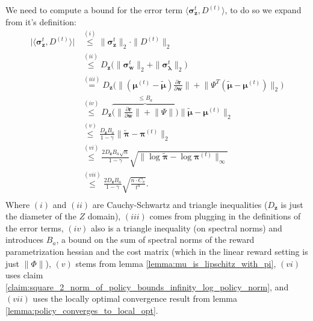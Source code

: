 We need to compute a bound for the error term $\langle \bm{\sigma}_{\bm{z}}^{t}, D^{(t)} \rangle$, to do so we expand from it's definition:
\begin{align*}
   \Big| \langle \bm{\sigma}_{\bm{z}}^{t}, D^{(t)} \rangle  \Big|
    &\stackrel{(i)}{\leq}  \|\bm{\sigma}_{\bm{z}}^{t} \|_2 \cdot \| D^{(t)}\|_2\\
    &\stackrel{(ii)}{\leq} D_{\bm{z}} \big(\|\bm{\sigma}_{\bm{w}}^{t} \|_2 + \|\bm{\sigma}_{\bm{\lambda}}^{t} \|_2 \big) \\
    &\stackrel{(iii)}{=} D_{\bm{z}} \Big(
        \Big\|
            (\bm{\mu}^{(t)} - \tilde{\bm{\mu}}) 
            \frac{\partial \bm{r}}{\partial \bm{w}}
        \Big\|
        + \Big\|
            \Psi^T (\tilde{\bm{\mu}}- \bm{\mu}^{(t)})
        \Big\|_2 \Big)\\
    &\stackrel{(iv)}{\leq} D_{\bm{z}} \overbrace{\Big(
        \Big\|
            \frac{\partial \bm{r}}{\partial \bm{w}}
        \Big\|
        + \big\|
            \Psi
        \big\| \Big)}^{
        \leq B_a
        } \| \tilde{\bm{\mu}} - \bm{\mu}^{(t)}\|_2\\
    &\stackrel{(v)}{\leq} 
    \frac{D_{\bm{z}} B_a}{1 - \gamma}
    \| \tilde{\bm{\pi}} - \bm{\pi}^{(t)}\|_2 
    \\
    &\stackrel{(vi)}{\leq}
    \frac{2 D_{\bm{z}} B_a \sqrt{n}}{1 - \gamma}
    \sqrt{\| \log \tilde{\bm{\pi}} - \log \bm{\pi}^{(t)}\|_\infty} \\
    &\stackrel{(vii)}{\leq} 
    \frac{2 D_{\bm{z}} B_a}{1 - \gamma}
    \sqrt{\frac{n \cdot C_\pi}{t^{u}}}. \\
\end{align*}
Where $(i)$ and $(ii)$ are Cauchy-Schwartz and triangle inequalities ($D_{\bm{z}}$ is just the diameter of the $Z$ domain), $(iii)$ comes from plugging in the definitions of the error terms, $(iv)$ also is a triangle inequality (on spectral norms) and introduces $B_a$, a bound on the sum of spectral norms of the reward parametrization hessian and the cost matrix (which in the linear reward setting is just $\|\Phi\|$), $(v)$ stems from lemma \ref{lemma:mu_is_lipschitz_with_pi}, $(vi)$ uses claim \ref{claim:square_2_norm_of_policy_bounds_infinity_log_policy_norm}, and $(vii)$ uses the locally optimal convergence result from lemma \ref{lemma:policy_converges_to_local_opt}. \\

